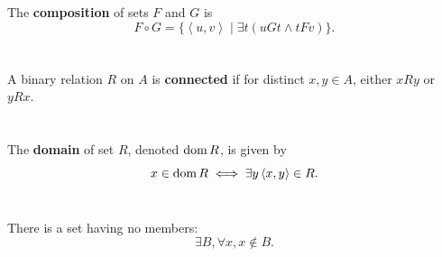 \documentclass{report}
\newcommand{\pair}[1]{\left< #1 \right>}
\begin{document}
The \textbf{composition} of sets $F$ and $G$ is
  $$F \circ G = \{\pair{u, v} \mid \exists t(uGt \land tFv)\}.$$

\begin{definition}

  \statementpadding



\end{definition}

\section{}%

A binary relation $R$ on $A$ is \textbf{connected} if for distinct $x, y \in A$, either $xRy$ or $yRx$.

\begin{definition}


\end{definition}

\section{}%

The \textbf{domain} of set $R$, denoted $\mathop{\text{dom}}{R}$, is given by
  $$x \in \dom{R} \iff \exists y \pair{x, y} \in R.$$

\begin{definition}

  \statementpadding



\end{definition}

\section{}%

There is a set having no members:
  $$\exists B, \forall x, x \not\in B.$$

\begin{axiom}


\end{axiom}
\end{document}
